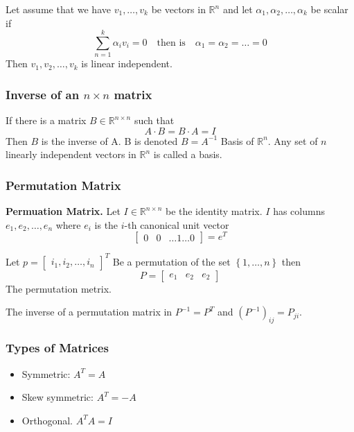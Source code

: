 \documentclass{article}
\theoremstyle{remark}
\begin{document}
Let assume that we have $v_{1}, \ldots, v_{k}$ be vectors in $\mathbb{R}^{n}$ and let $\alpha_1, \alpha_2, \ldots , \alpha_{k}$ be scalar if \[
\sum_{n=1}^{k} \alpha_i v_i = 0 \quad \text{then is} \quad \alpha_1=\alpha_2 = \ldots = 0   
\] 
Then $v_1, v_2, \ldots, v_{k}$ is linear independent. 

\subsubsection{Inverse of an $n\times n $ matrix}%
\label{ssub:inverse_of_an_ntimes_n_matrix}

If there is a matrix $B \in \mathbb{R}^{n\times n }$ such that \[
A\cdot B= B\cdot A = I
\] Then $B$ is the inverse of A.
B is denoted $B = A ^{-1}$ 
Basis of $\mathbb{R}^{n}$. Any set of $n$ linearly independent vectors in $\mathbb{R}^{n}$ is called a basis. \par

\subsubsection{Permutation Matrix}%
\label{ssub:permutation_matrix}


\textbf{Permuation Matrix.} Let $I \in \mathbb{R}^{n\times n }$ be the identity matrix. $I$ has columns $e_1, e_2, \ldots , e_n$ where $e_i$ is the $i$-th canonical unit vector \[
\begin{bmatrix} 
  0 & 0 & \ldots 1 \ldots 0 
\end{bmatrix} 
= e^{T}
\] 


Let $p = \begin{bmatrix} 
i_1, i_2, \ldots, i_n
\end{bmatrix}^{T} $ 
Be a permutation of the set $\left\{ 1, \ldots, n \right\}$ then \[
P = \begin{bmatrix} 
  e_1 & e_2 & e_2 
\end{bmatrix} 
\] 
The permutation metrix. 


The inverse of a permutation matrix in $P^{-1} = P^{T}$ and $\left( P^{-1} \right)_{ij} = P_{ji}$.

\subsubsection{Types of Matrices}%
\label{ssub:types_of_matrices}

\begin{itemize}
  \item Symmetric: $A^{T} = A$
  \item Skew symmetric: $A^{T} = -A$
  \item Orthogonal. $A^{T} A = I$
\end{itemize}





  



\end{document}
